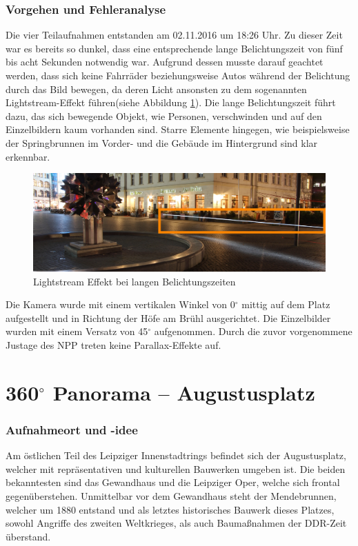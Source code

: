 \documentclass[liststotoc,bibtotoc,fontsize=14pt,]{scrreprt}
\begin{document}
			
	\subsubsection{Vorgehen und Fehleranalyse}
	Die vier Teilaufnahmen entstanden am 02.11.2016 um 18:26 Uhr. Zu dieser Zeit war es bereits so dunkel, dass eine entsprechende lange Belichtungszeit von fünf bis acht Sekunden notwendig war. Aufgrund dessen musste darauf geachtet werden, dass sich keine Fahrräder beziehungsweise Autos während der Belichtung durch das Bild bewegen, da deren Licht ansonsten zu dem sogenannten \grqq{}Lightstream-Effekt\grqq{} führen(siehe Abbildung \ref{img:ls}). Die lange Belichtungszeit führt dazu, das sich bewegende Objekt, wie Personen, verschwinden und auf den Einzelbildern kaum vorhanden sind. Starre Elemente hingegen, wie beispielsweise der Springbrunnen im Vorder- und die Gebäude im Hintergrund sind klar erkennbar. 
	
		\begin{figure}[H]
			\includegraphics[width=\linewidth]{img/lighstream.jpg}
			\caption{Lightstream Effekt bei langen Belichtungszeiten}
			\label{img:ls}
		\end{figure}
	
	\bigskip
	Die Kamera wurde mit einem vertikalen Winkel von 0$^\circ$  mittig auf dem Platz aufgestellt und in Richtung der Höfe am Brühl ausgerichtet. Die Einzelbilder wurden mit einem Versatz von 45$^\circ$ aufgenommen. Durch die zuvor vorgenommene Justage des NPP treten keine Parallax-Effekte auf. 
	
	\section{360$^\circ$ Panorama -- Augustusplatz}
	\label{sec:augustus}
	\subsubsection{Aufnahmeort und -idee}
	Am östlichen Teil des Leipziger Innenstadtrings befindet sich der Augustusplatz, welcher mit repräsentativen und kulturellen Bauwerken umgeben ist. Die beiden bekanntesten sind das Gewandhaus und die Leipziger Oper, welche sich frontal gegenüberstehen. Unmittelbar vor dem Gewandhaus steht der Mendebrunnen, welcher um 1880 entstand und als letztes historisches Bauwerk dieses Platzes, sowohl Angriffe des zweiten Weltkrieges, als auch Baumaßnahmen der DDR-Zeit überstand. 
	
\end{document}
